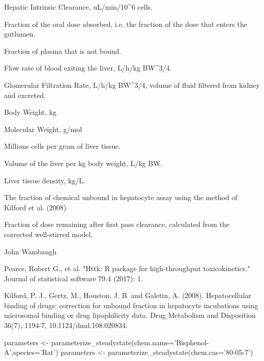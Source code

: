 \documentclass[a4paper]{book}
\begin{document}
%
\begin{Value}
\begin{ldescription}
\item[\code{Clint}] Hepatic Intrinsic Clearance, uL/min/10\textasciicircum{}6 cells.
\item[\code{Fgutabs}] Fraction of the oral dose absorbed, i.e. the fraction of the
dose that enters the gutlumen.
\item[\code{Funbound.plasma}] Fraction of plasma that is not bound.
\item[\code{Qtotal.liverc}] Flow rate of blood exiting the liver, L/h/kg BW\textasciicircum{}3/4.
\item[\code{Qgfrc}] Glomerular Filtration Rate, L/h/kg
BW\textasciicircum{}3/4, volume of fluid filtered from kidney and excreted.
\item[\code{BW}] Body Weight, kg
\item[\code{MW}] Molecular Weight, g/mol
\item[\code{million.cells.per.gliver}] Millions cells per gram of liver tissue.
\item[\code{Vliverc}] Volume of the liver per kg body weight, L/kg BW.
\item[\code{liver.density}] Liver tissue density, kg/L.
\item[\code{Fhep.assay.correction}] The fraction of chemical unbound in hepatocyte
assay using the method of Kilford et al. (2008)
\item[\code{hepatic.bioavailability}] Fraction of dose remaining after first pass
clearance, calculated from the corrected well-stirred model.
\end{ldescription}
\end{Value}
%
\begin{Author}\relax
John Wambaugh
\end{Author}
%
\begin{References}\relax
Pearce, Robert G., et al. "Httk: R package for high-throughput 
toxicokinetics." Journal of statistical software 79.4 (2017): 1.

Kilford, P. J., Gertz, M., Houston, J. B. and Galetin, A.
(2008). Hepatocellular binding of drugs: correction for unbound fraction in
hepatocyte incubations using microsomal binding or drug lipophilicity data.
Drug Metabolism and Disposition 36(7), 1194-7, 10.1124/dmd.108.020834.
\end{References}
%
\begin{Examples}
\begin{ExampleCode}

 parameters <- parameterize_steadystate(chem.name='Bisphenol-A',species='Rat')
 parameters <- parameterize_steadystate(chem.cas='80-05-7')

\end{ExampleCode}
\end{Examples}
\end{document}
